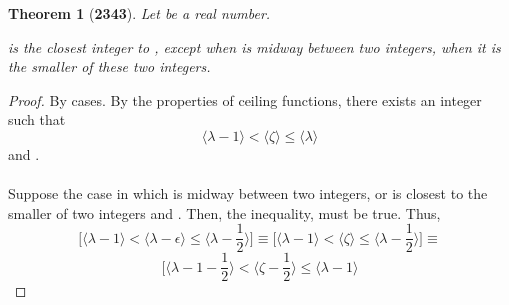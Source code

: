 \documentclass[preview]{standalone}
\newtheorem{theorem}{Theorem}
\begin{document}
\begin{theorem}[\textbf{2343}]
    Let \bm{$\zeta$} be a real number. 
    \begin{center}
         is the closest integer to \bm{$\zeta$}, 
        except when \bm{$\zeta$} is midway between two integers, 
        when it is the smaller of these two integers.
    \end{center}
\end{theorem}

\begin{proof}
    By cases. By the properties of ceiling functions, 
    there exists an integer \bm{$\lambda$} such that 
    \begin{equation*}
        \Big \langle \lambda - 1 \Big \rangle
            < 
        \Big \langle \zeta \Big \rangle
            \leq 
        \Big \langle \lambda \Big \rangle
    \end{equation*}
    and 
    \bm{$\lceil \zeta \rceil - \zeta = \epsilon$}. 
    \\ \\
     Suppose the case in which 
    \bm{$\zeta$} is midway between two integers, 
    or is closest to the smaller of two integers 
    \bm{$\big \langle \lambda -1 \big \rangle$} and
    \bm{$\lambda$}. 
    Then, the inequality,
    must be true. Thus, 
    \begin{equation*}
        \bigg[
            \Big \langle
                \lambda - 1
            \Big \rangle
                <
            \Big \langle
                \lambda - \epsilon
            \Big \rangle
                \leq
            \Big \langle
                \lambda - \frac{1}{2}
            \Big \rangle
        \bigg]
            \equiv
        \bigg[
            \Big \langle
                \lambda - 1
            \Big \rangle
                <
            \Big \langle
                \zeta
            \Big \rangle
                \leq
            \Big \langle    
                \lambda - \frac{1}{2}
            \Big \rangle
        \bigg]
            \equiv
    \end{equation*}
    \begin{equation*}
        \bigg[
            \Big \langle
                \lambda - 1 - \frac{1}{2}
            \Big \rangle
                <
            \Big \langle 
                \zeta - \frac{1}{2}
            \Big \rangle
                \leq
            \Big \langle 
                \lambda - 1
            \Big \rangle

\end{equation*}
\end{proof}
\end{document}
